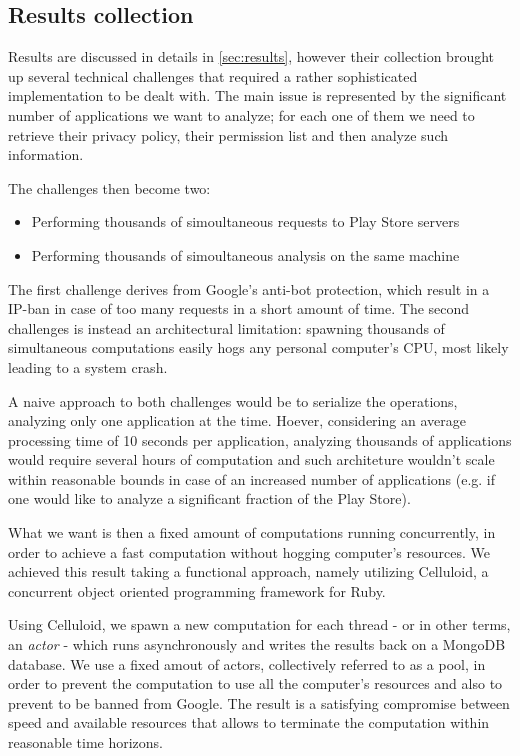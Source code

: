 \documentclass[twoside,letterpaper]{soups}
\theoremstyle{definition}
\begin{document}
\subsection{Results collection}
Results are discussed in details in \autoref{sec:results}, however their collection brought up several technical challenges that required a rather sophisticated implementation to be dealt with. The main issue is represented by the significant number of applications we want to analyze; for each one of them we need to retrieve their privacy policy, their permission list and then analyze such information.

The challenges then become two:
\begin{itemize}
  \item Performing thousands of simoultaneous requests to Play Store servers
  \item Performing thousands of simoultaneous analysis on the same machine
\end{itemize}

The first challenge derives from Google's anti-bot protection, which result in a IP-ban in case of too many requests in a short amount of time.
The second challenges is instead an architectural limitation: spawning thousands of simultaneous computations easily hogs any personal computer's CPU, most likely leading to a system crash.

A naive approach to both challenges would be to serialize the operations, analyzing only one application at the time. Hoever, considering an average processing time of 10 seconds per application, analyzing thousands of applications would require several hours of computation and such architeture wouldn't scale within reasonable bounds in case of an increased number of applications (e.g. if one would like to analyze a significant fraction of the Play Store).

What we want is then a fixed amount of computations running concurrently, in order to achieve a fast computation without hogging computer's resources. We achieved this result taking a functional approach, namely utilizing Celluloid, a concurrent object oriented programming framework for Ruby.

Using Celluloid, we spawn a new computation for each thread - or in other terms, an \emph{actor} - which runs asynchronously and writes the results back on a MongoDB database. We use a fixed amout of actors, collectively referred to as a pool, in order to prevent the computation to use all the computer's resources and also to prevent to be banned from Google.
The result is a satisfying compromise between speed and available resources that allows to terminate the computation within reasonable time horizons.
\end{document}
